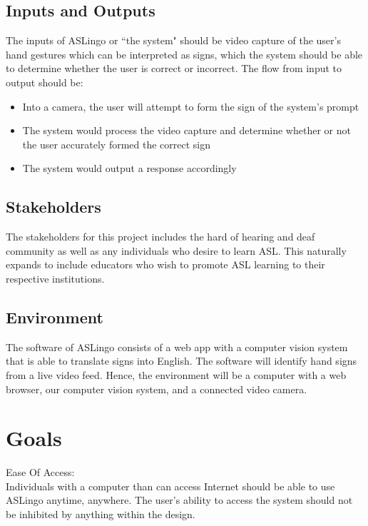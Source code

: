 \documentclass{article}
\begin{document}
\subsection{Inputs and Outputs}

The inputs of ASLingo or ``the system" should be video capture of the user's hand gestures which can be interpreted as signs, which the system should be able to determine whether the user is correct or incorrect. The flow from input to output should be:

\begin{itemize}
    \item Into a camera, the user will attempt to form the sign of the system's prompt
    \item The system would process the video capture and determine whether or not the user accurately formed the correct sign
    \item The system would output a response accordingly
\end{itemize}

\subsection{Stakeholders}

The stakeholders for this project includes the hard of hearing and deaf community as well as any individuals who desire to learn ASL. This naturally expands to include educators who wish to promote ASL learning to their respective institutions.

\subsection{Environment}

The software of ASLingo consists of a web app with a computer vision system that is able to translate signs into English. The software will identify hand signs from a live video feed. Hence, the environment will be a computer with a web browser, our computer vision system, and a connected video camera.

\section{Goals}

Ease Of Access:\\
Individuals with a computer than can access Internet should be able to use ASLingo anytime, anywhere. The user's ability to access the system should not be inhibited by anything within the design.
\end{document}
